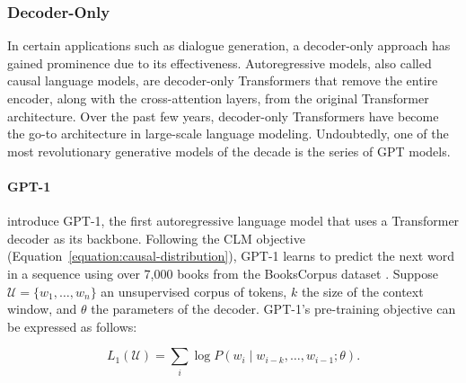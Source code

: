 
\subsubsection{Decoder-Only}

In certain applications such as dialogue generation, a decoder-only approach has gained prominence due to its effectiveness. Autoregressive models, also called causal language models, are decoder-only Transformers that remove the entire encoder, along with the cross-attention layers, from the original Transformer architecture. Over the past few years, decoder-only Transformers have become the go-to architecture in large-scale language modeling. Undoubtedly, one of the most revolutionary generative models of the decade is the series of \ac{GPT} \citep{radford2018improving} models.


\paragraph{GPT-1}

\citet{radford2018improving} introduce \ac{GPT}-1, the first autoregressive language model that uses a Transformer decoder as its backbone. Following the \ac{CLM} objective (Equation~\ref{equation:causal-distribution}), \ac{GPT}-1 learns to predict the next word in a sequence using over 7,000 books from the BooksCorpus dataset \citep{zhu2015aligning}. Suppose $\mathcal{U} = \{w_1, \ldots, w_n\}$ an unsupervised corpus of tokens, $k$ the size of the context window, and $\theta$ the parameters of the decoder. \ac{GPT}-1's pre-training objective can be expressed as follows:

\begin{equation}
    L_1(\mathcal{U}) = \sum_i \log P(w_i \mid w_{i-k}, \ldots, w_{i-1}; \theta).
\end{equation}

